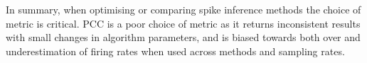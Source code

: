 \documentclass[a4paper]{article}
\begin{document}
In summary, when optimising or comparing spike inference methods the choice of metric is critical. PCC is a poor choice of metric as it returns inconsistent results with small changes in algorithm parameters, and is biased towards both over and underestimation of firing rates when used across methods and sampling rates.





\begin{figure}%
\centering
{}
%
%

\end{figure}
\end{document}
